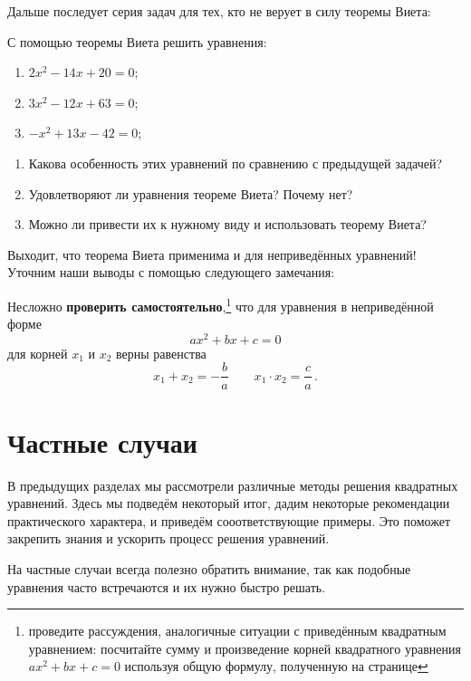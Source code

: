 \documentclass[11pt,fleqn]{book} %
\begin{document}
Дальше последует серия задач для тех, кто не верует в силу теоремы Виета:


\begin{problem}
С помощью теоремы Виета решить уравнения:
\begin{enumerate}
\item $2x^2 - 14x + 20 = 0$;
\item $3x^2 - 12x + 63 = 0$;
\item $-x^2 + 13x - 42 = 0$;
\end{enumerate}

\begin{enumerate}
\item Какова особенность этих уравнений по сравнению с предыдущей задачей? \item Удовлетворяют ли уравнения теореме Виета? Почему нет?
\item Можно ли привести их к нужному виду и использовать теорему Виета?
\end{enumerate}

\end{problem}

Выходит, что теорема Виета применима и для неприведённых уравнений! Уточним наши выводы с помощью следующего замечания:

\begin{remark}
\label{com:viete}
Несложно \textbf{проверить самостоятельно},\footnote{проведите рассуждения, аналогичные ситуации с приведённым квадратным уравнением: посчитайте сумму и произведение корней квадратного уравнения $ax^2 +bx+c = 0$ используя общую формулу, полученную на странице \pageref{sec:quad_gen}} что для уравнения в неприведённой форме $$ax^2 +bx+c = 0$$ для корней $x_1$ и $x_2$ верны равенства 
$$ \boxed{x_1 + x_2 = -\frac{b}{a} \qquad x_1 \cdot x_2 = \frac{c}{a}}\,.$$
\end{remark}


\chapter{Частные случаи}

В предыдущих разделах мы рассмотрели различные методы решения квадратных уравнений. Здесь мы подведём некоторый итог, дадим некоторые рекомендации практического характера, и приведём сооответствующие примеры. Это поможет закрепить знания и ускорить процесс решения уравнений.

На частные случаи всегда полезно обратить внимание, так как подобные уравнения часто встречаются и их нужно быстро решать.
\end{document}
